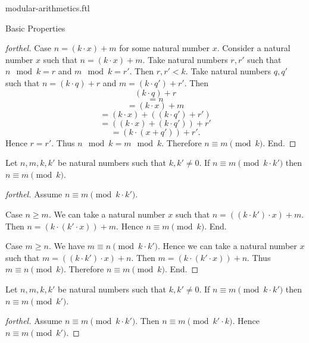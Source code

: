 \documentclass{naproche-library}
\begin{document}
\begin{smodule}[title=Modular Arithmetics]{modular-arithmetics.ftl}
\begin{sfragment}{Basic Properties}
\begin{proof}[forthel]
    Case $n = (k \cdot x) + m$ for some natural number $x$.
      Consider a natural number $x$ such that $n = (k \cdot x) + m$.
      Take natural numbers $r, r'$ such that $n \mod k = r$ and $m \mod k = r'$.
      Then $r, r' < k$.
      Take natural numbers $q, q'$ such that $n = (k \cdot q) + r$ and $m = (k \cdot q') + r'$.
      Then
      \[  (k \cdot q) + r                         \]
      \[    = n                                   \]
      \[    = (k \cdot x) + m                     \]
      \[    = (k \cdot x) + ((k \cdot q') + r')   \]
      \[    = ((k \cdot x) + (k \cdot q')) + r'   \]
      \[    = (k \cdot (x + q')) + r'.            \]
      Hence $r = r'$.
      Thus $n \mod k = m \mod k$.
      Therefore $n \equiv m \pmod{k}$.
    End.
  \end{proof}

  \begin{proposition}[forthel,id=ARITHMETIC_08_2988318228742144]
    Let $n, m, k, k'$ be natural numbers such that $k, k' \neq 0$.
    If $n \equiv m \pmod{k \cdot k'}$ then $n \equiv m \pmod{k}$.
  \end{proposition}
  \begin{proof}[forthel]
    Assume $n \equiv m \pmod{k \cdot k'}$.

    Case $n \geq m$.
      We can take a natural number $x$ such that $n = ((k \cdot k') \cdot x) + m$.
      Then $n = (k \cdot (k' \cdot x)) + m$.
      Hence $n \equiv m \pmod{k}$.
    End.

    Case $m \geq n$.
      We have $m \equiv n \pmod{k \cdot k'}$.
      Hence we can take a natural number $x$ such that $m = ((k \cdot k') \cdot x) + n$.
      Then $m = (k \cdot (k' \cdot x)) + n$.
      Thus $m \equiv n \pmod{k}$.
      Therefore $n \equiv m \pmod{k}$.
    End.
  \end{proof}

  \begin{corollary}[forthel,id=ARITHMETIC_08_5895145169879040]
    Let $n, m, k, k'$ be natural numbers such that $k, k' \neq 0$.
    If $n \equiv m \pmod{k \cdot k'}$ then $n \equiv m \pmod{k'}$.
  \end{corollary}
  \begin{proof}[forthel]
    Assume $n \equiv m \pmod{k \cdot k'}$.
    Then $n \equiv m \pmod{k' \cdot k}$.
    Hence $n \equiv m \pmod{k'}$.
  \end{proof}


\end{sfragment}
\end{smodule}
\end{document}

